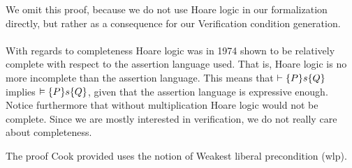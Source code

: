 We omit this proof, because we do not use Hoare logic in our formalization directly, but rather as a consequence for our Verification condition generation.
\\~\\
With regards to completeness Hoare logic was in 1974 shown to be relatively complete with respect to the assertion language used\cite{cook}.
That is, Hoare logic is no more incomplete than the assertion language.
This means that $\vdash \{P\}s\{Q\}$ implies $\vDash \{P\}s\{Q\}$, given that the assertion language is expressive enough.
Notice furthermore that without multiplication Hoare logic would not be complete.
Since we are mostly interested in verification, we do not really care about completeness.

The proof Cook provided uses the notion of Weakest liberal precondition (wlp).
